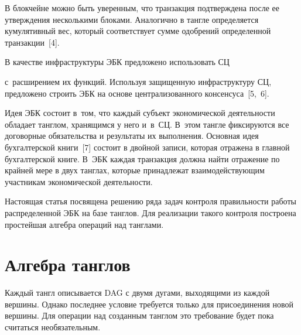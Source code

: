   


  В блокчейне можно быть уверенным, что транзакция подтверждена после ее утверждения несколькими блоками. Аналогично в тангле определяется кумулятивный вес, который соответствует сумме одобрений определенной транзакции~[4].


  


  В качестве инфраструктуры ЭБК предложено использовать СЦ


   с~расширением их функций. Используя защищенную инфраструктуру СЦ, предложено строить ЭБК на основе централизованного консенсуса~[5,~6].


   


  Идея ЭБК состоит в~том, что каждый субъект экономической деятельности обладает танглом, хранящимся у него и~в~СЦ. В~этом тангле фиксируются все договорные обязательства и результаты их выполнения. Основная идея бухгалтерской книги~[7] состоит в двойной записи, которая отражена в главной бухгалтерской книге. В~ЭБК каждая транзакция должна найти отражение по крайней мере в двух танглах, которые принадлежат взаимодействующим участникам экономической деятельности. 


  


  Настоящая статья посвящена решению ряда задач контроля правильности работы распределенной ЭБК на базе танглов. Для реализации такого контроля построена простейшая алгебра операций над танглами. 


  


  \vspace*{-3pt}


  


  \section{Алгебра танглов}


  


  \vspace*{-3pt}


   


  Каждый тангл описывается DAG с двумя дугами, выходящими из каждой вершины. Однако последнее условие требуется только для присоединения новой вершины. Для операции над созданным танглом это требование будет пока считаться необязательным.


